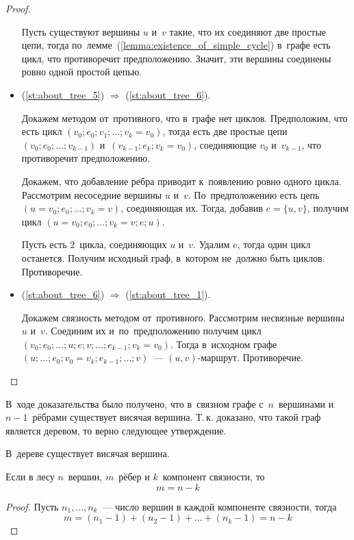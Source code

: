 \begin{proof}
\begin{itemize}
	Пусть существуют вершины $u$ и~$v$ такие, что их соединяют две простые цепи, тогда по~лемме~(\ref{lemma:existence_of_simple_cycle}) в~графе есть цикл, что противоречит предположению.
	Значит, эти вершины соединены ровно одной простой цепью.
	
	\item (\ref{st:about_tree_5}) $\Rightarrow$ (\ref{st:about_tree_6}).
	
	Докажем методом от~противного, что в~графе нет циклов.
	Предположим, что есть цикл $(v_0; e_0; v_1; \allowbreak \ldots; \allowbreak v_k = v_0)$, тогда есть две простые цепи $(v_0; e_0; \ldots; v_{k-1})$ и~$(v_{k-1}; e_k; v_k = v_0)$, соединяющие $v_0$ и~$v_{k-1}$, что противоречит предположению.
	
	Докажем, что добавление ребра приводит к~появлению ровно одного цикла.
	Рассмотрим несоседние вершины $u$ и~$v$.
	По~предположению есть цепь $(u = v_0; e_0; \ldots; v_k = v)$, соединяющая их.
	Тогда, добавив $e = \{ u, v \}$, получим цикл $(u = v_0; e_0; \ldots; v_k = v; e; u)$.
	
	Пусть есть $2$~цикла, соединяющих $u$ и~$v$.
	Удалим $e$, тогда один цикл останется.
	Получим исходный граф, в~котором не~должно быть циклов.
	Противоречие.
	
	\item (\ref{st:about_tree_6}) $\Rightarrow$ (\ref{st:about_tree_1}).
	
	Докажем связность методом от~противного.
	Рассмотрим несвязные вершины $u$ и~$v$.
	Соединим их и~по~предположению получим цикл $(v_0; e_0; \ldots; u; e; v; \ldots; e_{k-1}; v_k = v_0)$.
	Тогда в~исходном графе $(u; \ldots; e_0; v_0 = v_k; e_{k-1}; \ldots; v)$~--- $(u, v)$-маршрут.
	Противоречие.
\end{itemize}
\end{proof}

В~ходе доказательства было получено, что в~связном графе с~$n$~вершинами и~$n - 1$~рёбрами существует висячая вершина. Т.\,к. доказано, что такой граф является деревом, то верно следующее утверждение.
\begin{statement}
В~дереве существует висячая вершина.
\end{statement}

\begin{statement}
Если в лесу $n$~вершин, $m$~рёбер и $k$~компонент связности, то
\begin{equation*}
m = n - k
\end{equation*}
\end{statement}
\begin{proof}
Пусть $n_1, \ldots, n_k$~--- число вершин в каждой компоненте связности, тогда
\begin{equation*}
m = (n_1 - 1) + (n_2 - 1) + \ldots + (n_k - 1) = n - k
\end{equation*}
\end{proof}
